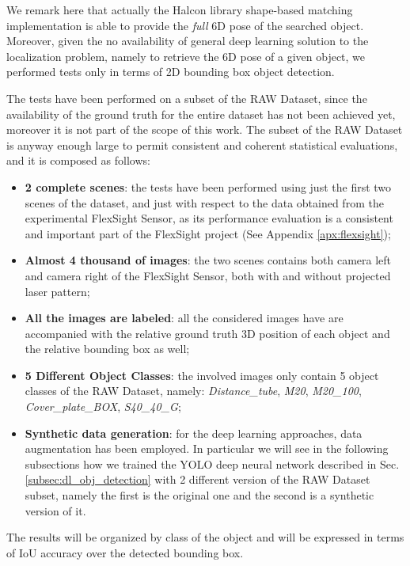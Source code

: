 We remark here that actually the Halcon library shape-based matching implementation is able to provide the \emph{full} 6D pose of the searched object. Moreover, given the no availability of general deep learning solution to the localization problem, namely to retrieve the 6D pose of a given object, we performed tests only in terms of 2D bounding box object detection. 

The tests have been performed on a subset of the RAW Dataset, since the availability of the ground truth for the entire dataset has not been achieved yet, moreover it is not part of the scope of this work. The subset of the RAW Dataset is anyway enough large to permit consistent and coherent statistical evaluations, and it is composed as follows:

\begin{itemize}
	\item \textbf{2 complete scenes}: the tests have been performed using just the first two scenes of the dataset, and just with respect to the data obtained from the experimental FlexSight Sensor, as its performance evaluation is a consistent and important part of the FlexSight project (See Appendix \ref{apx:flexsight});
	\item \textbf{Almost 4 thousand of images}: the two scenes contains both camera left and camera right of the FlexSight Sensor, both with and without projected laser pattern;
	\item \textbf{All the images are labeled}: all the considered images have are accompanied with the relative ground truth 3D position of each object and the relative bounding box as well;
	\item \textbf{5 Different Object Classes}: the involved images only contain 5 object classes of the RAW Dataset, namely: \emph{Distance\_tube}, \emph{M20}, \emph{M20\_100}, \emph{Cover\_plate\_BOX}, \emph{S40\_40\_G};
	\item \textbf{Synthetic data generation}: for the deep learning approaches, data augmentation has been employed. In particular we will see in the following subsections how we trained the YOLO deep neural network described in Sec. \ref{subsec:dl_obj_detection} with 2 different version of the RAW Dataset subset, namely the first is the original one and the second is a synthetic version of it.
\end{itemize}

The results will be organized by class of the object and will be expressed in terms of IoU accuracy over the detected bounding box.

